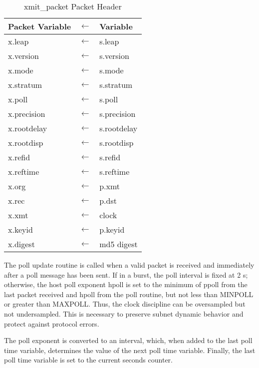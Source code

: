 \begin{table}[htb]
  \center
  \begin{tabular}{| l c l |}
    \hline
    Packet Variable & $ \leftarrow $ & Variable \\
    \hline
    \hline
    x.leap      & $ \leftarrow $ & s.leap      \\
    x.version   & $ \leftarrow $ & s.version   \\
    x.mode      & $ \leftarrow $ & s.mode      \\
    x.stratum   & $ \leftarrow $ & s.stratum   \\
    x.poll      & $ \leftarrow $ & s.poll      \\
    x.precision & $ \leftarrow $ & s.precision \\
    x.rootdelay & $ \leftarrow $ & s.rootdelay \\
    x.rootdisp  & $ \leftarrow $ & s.rootdisp  \\
    x.refid     & $ \leftarrow $ & s.refid     \\
    x.reftime   & $ \leftarrow $ & s.reftime   \\
    x.org       & $ \leftarrow $ & p.xmt       \\
    x.rec       & $ \leftarrow $ & p.dst       \\
    x.xmt       & $ \leftarrow $ & clock       \\
    x.keyid     & $ \leftarrow $ & p.keyid     \\
    x.digest    & $ \leftarrow $ & md5 digest  \\
    \hline
  \end{tabular}
  \caption{xmit\_packet Packet Header}
  \label{xmit_packet_packet_header}
\end{table}

The poll update routine is called when a valid packet is received and
immediately after a poll message has been sent. If in a burst, the
poll interval is fixed at 2 s; otherwise, the host poll exponent
hpoll is set to the minimum of ppoll from the last packet received
and hpoll from the poll routine, but not less than MINPOLL or greater
than MAXPOLL. Thus, the clock discipline can be oversampled but not
undersampled. This is necessary to preserve subnet dynamic behavior
and protect against protocol errors.

The poll exponent is converted to an interval, which, when added to
the last poll time variable, determines the value of the next poll
time variable. Finally, the last poll time variable is set to the
current seconds counter.
